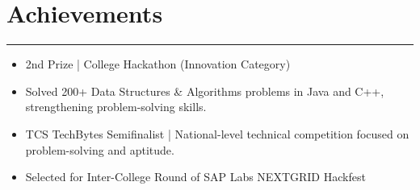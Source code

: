 \documentclass[11pt,a4paper]{article}
\newcommand{\sectionline}{\vspace{-4pt}\hrule\vspace{4pt}}
\newcommand{\blockspace}{\vspace{2pt}}
\begin{document}
\blockspace

\section*{Achievements}
\sectionline
\begin{itemize}
	\item 2nd Prize \;|\; College Hackathon (Innovation Category)
	\item Solved 200+ Data Structures & Algorithms problems in Java and C++, strengthening problem-solving skills.
	\item TCS TechBytes Semifinalist \;|\; National-level technical competition focused on problem-solving and aptitude.
	\item Selected for Inter-College Round of SAP Labs NEXTGRID Hackfest
\end{itemize}
\end{document}
